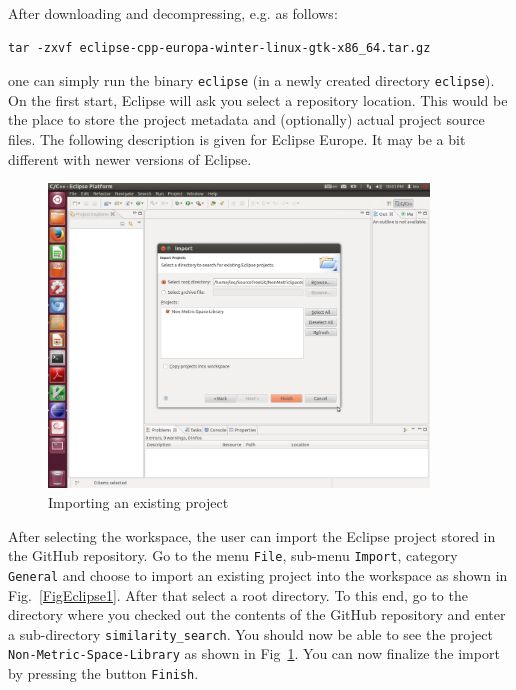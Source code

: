 \documentclass[runningheads,a4paper]{llncs}
\newcommand{\ttt}[1]{\texttt{#1}}
\begin{document}
{After downloading and decompressing, e.g. as follows:
\begin{verbatim}
tar -zxvf eclipse-cpp-europa-winter-linux-gtk-x86_64.tar.gz
\end{verbatim}
one can simply run the binary \ttt{eclipse} (in a
newly created directory \ttt{eclipse}).
On the first start, Eclipse will ask you select a repository location.
This would be the place to store the project metadata and (optionally)
actual project source files.
The following description is given for Eclipse Europe. 
It may be a bit different with newer versions of Eclipse.


\begin{figure}
\centering
\caption{\label{FigEclipse2}Importing an existing project}
\includegraphics[width=0.9\textwidth]{figures/Eclipse2.pdf}
\end{figure}

After selecting the workspace, the user can import the Eclipse project
stored in the GitHub repository.
Go to the menu \ttt{File}, sub-menu \ttt{Import}, category \ttt{General} 
and choose to import
an existing project into the workspace as shown in Fig.~\ref{FigEclipse1}.
After that select a root directory. To this end,
go to the directory where you checked out the contents 
of the GitHub repository and enter a sub-directory \ttt{similarity\_search}.
You should now be able to see the project \ttt{Non-Metric-Space-Library}
as shown in Fig~\ref{FigEclipse2}.
You can now finalize the import by pressing the button \ttt{Finish}.

}
\end{document}

